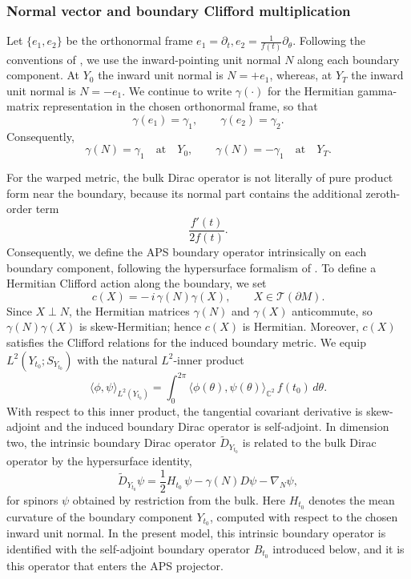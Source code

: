 \documentclass[11pt]{article}
\theoremstyle{definition}
\numberwithin{equation}{section}
\begin{document}
\subsubsection{Normal vector and boundary Clifford multiplication}\label{subsec:boundary-clifford}
Let \(\{e_1,e_2\}\) be the orthonormal frame $e_1= \partial_t, e_2= \frac{1}{f(t)}\partial_\theta.$
Following the conventions of \cite{Hijazi}, we use the inward-pointing unit normal $N$ along each boundary
component. At $Y_0$ the inward unit normal is $N=+e_1$, whereas, at $Y_T$ the inward unit normal is
$N=-e_1$. We continue to write \(\gamma(\cdot)\) for the Hermitian gamma-matrix representation in the chosen orthonormal frame, so that
\begin{equation}
\gamma(e_1)=\gamma_1,\qquad \gamma(e_2)=\gamma_2.
\end{equation}
Consequently,
\begin{equation}
\gamma(N)=\gamma_1 \quad \text{at} \quad Y_0,
\qquad
\gamma(N)=-\gamma_1 \quad \text{at} \quad Y_T.
\end{equation}

For the warped metric, the bulk Dirac operator is not literally of pure product form near the boundary,
because its normal part contains the additional zeroth-order term
\begin{equation}
\frac{f'(t)}{2f(t)}.
\end{equation}
%
Consequently, we define the APS boundary operator intrinsically on each boundary component, following the hypersurface formalism of \cite{Hijazi}. To define a Hermitian Clifford action along the boundary, we set
\begin{equation}
c(X)=-\,i\,\gamma(N)\gamma(X),\qquad X\in \mathcal{T}(\partial M).
\end{equation}
Since \(X\perp N\), the Hermitian matrices \(\gamma(N)\) and \(\gamma(X)\) anticommute, so \(\gamma(N)\gamma(X)\) is skew-Hermitian; hence \(c(X)\) is Hermitian. Moreover, \(c(X)\) satisfies the Clifford relations for the induced boundary metric.
We equip \(L^2(Y_{t_0};S_{Y_{t_0}})\) with the natural \(L^2\)-inner product
\begin{equation}
\langle \phi,\psi\rangle_{L^2(Y_{t_0})}
=
\int_0^{2\pi}\langle \phi(\theta),\psi(\theta)\rangle_{\mathbb C^2}\,f(t_0)\,d\theta .
\end{equation}
With respect to this inner product, the tangential covariant derivative is skew-adjoint and the induced boundary Dirac operator is self-adjoint. In dimension two, the intrinsic boundary Dirac operator \(\tilde D_{Y_{t_0}}\) is related to the bulk Dirac operator by the hypersurface identity,
\begin{equation}
\tilde D_{Y_{t_0}}\psi
=
\frac12 H_{t_0}\,\psi-\gamma(N)D\psi-\nabla_N\psi,
\end{equation}
for spinors \(\psi\) obtained by restriction from the bulk. Here \(H_{t_0}\) denotes the mean curvature of the boundary component \(Y_{t_0}\), computed with respect to the chosen inward unit normal. In the present model, this intrinsic boundary operator is identified with the self-adjoint boundary operator \(B_{t_0}\) introduced below, and it is this operator that enters the APS projector.
\end{document}

